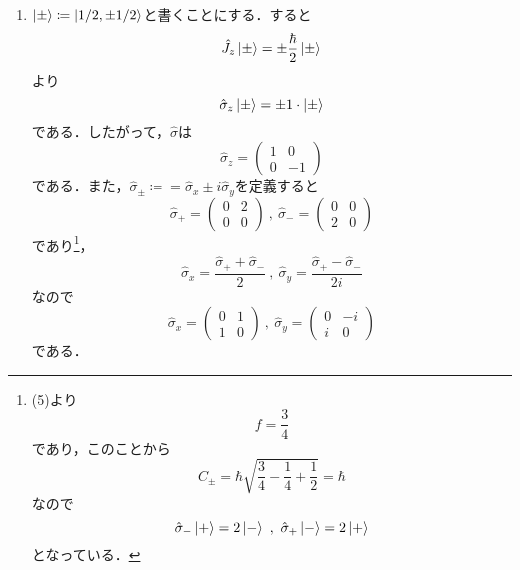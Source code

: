 \documentclass[a4paper,pdflatex,ja=standard]{bxjsarticle}
\begin{document}
\begin{enumerate}
  \item 
  $\ket{\pm}\coloneqq\ket{1/2,\pm1/2}$と書くことにする．すると
  \begin{equation}
    \hat{J}_{z}\ket{\pm}
    =
    \pm\frac{\hbar}{2}\ket{\pm}
  \end{equation}
  より
  \begin{equation}
    \hat{\sigma}_{z}\ket{\pm}
    =
    \pm1\cdot\ket{\pm}
  \end{equation}
  である．したがって，$\hat{\sigma}$は
  \begin{equation}
    \hat{\sigma}_{z}
    =
    \begin{pmatrix}
      1 & 0 \\
      0 & -1
    \end{pmatrix}
  \end{equation}
  である．また，$\hat{\sigma}_{\pm}\coloneqq=\hat{\sigma}_{x}\pm i\hat{\sigma}_{y}$を定義すると
  \begin{equation}
    \hat{\sigma}_{+}
    =
    \begin{pmatrix}
      0 & 2 \\
      0 & 0
    \end{pmatrix}
    \ ,\ 
    \hat{\sigma}_{-}
    =
    \begin{pmatrix}
      0 & 0 \\
      2 & 0
    \end{pmatrix}
  \end{equation}
  であり\footnote{
    (5)より
    $$
    f=\frac{3}{4}
    $$
    であり，このことから
    $$
    C_{\pm}
    =
    \hbar\sqrt{\frac{3}{4}-\frac{1}{4}+\frac{1}{2}}
    =
    \hbar
    $$
    なので
    $$
    \hat{\sigma}_{-}\ket{+}
    =
    2\ket{-}
    \ ,\ 
    \hat{\sigma}_{+}\ket{-}
    =
    2\ket{+}
    $$
    となっている．
  }，
  \begin{equation}
    \hat{\sigma}_{x}
    =
    \frac{\hat{\sigma}_{+}+\hat{\sigma}_{-}}{2}
    \ ,\ 
    \hat{\sigma}_{y}
    =
    \frac{\hat{\sigma}_{+}-\hat{\sigma}_{-}}{2i}
  \end{equation}
  なので
  \begin{equation}
    \hat{\sigma}_{x}
    =
    \begin{pmatrix}
      0 & 1 \\
      1 & 0
    \end{pmatrix}
    \ ,\ 
    \hat{\sigma}_{y}
    =
    \begin{pmatrix}
      0 & -i \\
      i & 0
    \end{pmatrix}
  \end{equation}
  である．


\end{enumerate}
\end{document}
